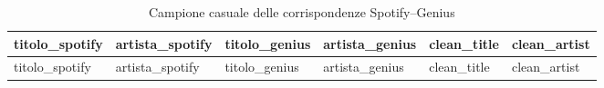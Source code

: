 \documentclass[
]{article}
\begin{document}
\begin{longtable}[]{@{}
  >{\raggedright\arraybackslash}p{}
  >{\raggedright\arraybackslash}p{}
  >{\raggedright\arraybackslash}p{}
  >{\raggedright\arraybackslash}p{}
  >{\raggedright\arraybackslash}p{}
  >{\raggedright\arraybackslash}p{}@{}}
\caption{Campione casuale delle corrispondenze
Spotify--Genius}\tabularnewline
\toprule\noalign{}
\begin{minipage}[b]{\linewidth}\raggedright
titolo\_spotify
\end{minipage} & \begin{minipage}[b]{\linewidth}\raggedright
artista\_spotify
\end{minipage} & \begin{minipage}[b]{\linewidth}\raggedright
titolo\_genius
\end{minipage} & \begin{minipage}[b]{\linewidth}\raggedright
artista\_genius
\end{minipage} & \begin{minipage}[b]{\linewidth}\raggedright
clean\_title
\end{minipage} & \begin{minipage}[b]{\linewidth}\raggedright
clean\_artist
\end{minipage} \\
\midrule\noalign{}
\endfirsthead
\toprule\noalign{}
\begin{minipage}[b]{\linewidth}\raggedright
titolo\_spotify
\end{minipage} & \begin{minipage}[b]{\linewidth}\raggedright
artista\_spotify
\end{minipage} & \begin{minipage}[b]{\linewidth}\raggedright
titolo\_genius
\end{minipage} & \begin{minipage}[b]{\linewidth}\raggedright
artista\_genius
\end{minipage} & \begin{minipage}[b]{\linewidth}\raggedright
clean\_title
\end{minipage} & \begin{minipage}[b]{\linewidth}\raggedright
clean\_artist
\end{minipage} \\

\end{longtable}
\end{document}

